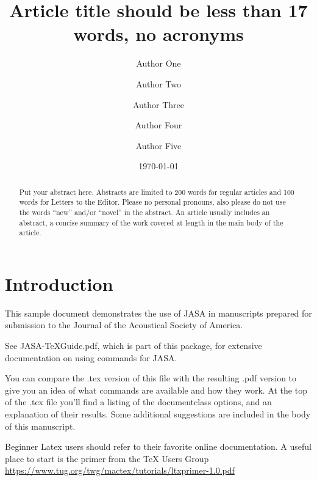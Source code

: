 \documentclass[reprint]{JASA}
\begin{document}
\title[JASA/Sample JASA Article]{Article title should be less than 17 words, no acronyms}
\author{Author One}
\author{Author Two}
\author{Author Three}

\author{Author Four}
 
\author{Author Five}			


\date{\today} 

\begin{abstract}
Put your abstract here. Abstracts are limited to 200 words for
regular articles and 100 words for Letters to the Editor. Please no
personal pronouns, also please do not use the words ``new'' and/or
``novel'' in the abstract. An article usually includes an abstract, a
concise summary of the work covered at length in the main body of the
article.     
\end{abstract}


\maketitle


\section{\label{sec:1} Introduction}
This sample document demonstrates the use of JASA in manuscripts 
prepared for submission to the Journal of the Acoustical Society of America. 

See JASA-TeXGuide.pdf, which is part of this package, for extensive
documentation on using commands for JASA.

You can compare the .tex version of this file with the resulting .pdf
version to give you an idea of what  commands are available and how
they work. At the top of the .tex file you'll find a listing of the
documentclass options, and an explanation of their results.
Some additional suggestions are included in the body of this
manuscript.  

  Beginner Latex users should refer to their favorite online documentation. A 
  useful place to start is the primer from the TeX Users Group 
  \url{https://www.tug.org/twg/mactex/tutorials/ltxprimer-1.0.pdf}
\end{document}
